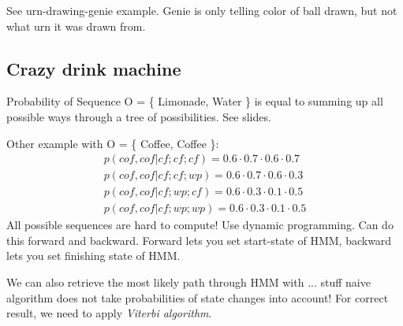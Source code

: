 \documentclass[11pt]{article}
\begin{document}
See urn-drawing-genie example. Genie is only telling color of ball drawn, but not what urn
it was drawn from. 

\subsection{Crazy drink machine}
Probability of Sequence O = \{ Limonade, Water \} is equal to summing up all possible ways
through a tree of possibilities. See slides.

Other example with O =  \{ Coffee, Coffee \}:
\begin{eqnarray*}
	p(cof, cof | cf; cf; cf) = 0.6 \cdot 0.7\cdot 0.6 \cdot 0.7 \\
	p(cof, cof | cf; cf; wp) = 0.6 \cdot 0.7\cdot 0.6\cdot0.3 \\
	p(cof, cof | cf; wp; cf) = 0.6 \cdot 0.3\cdot 0.1\cdot 0.5 \\
	p(cof, cof | cf; wp; wp) = 0.6 \cdot 0.3\cdot 0.1\cdot 0.5
\end{eqnarray*}
All possible sequences are hard to compute! Use dynamic programming. Can do this forward
and backward. Forward lets you set start-state of HMM, backward lets you set finishing
state of HMM.

We can also retrieve the most likely path through HMM with ... stuff naive algorithm does
 not take probabilities of state changes into account! For correct result, we need to
 apply \emph{Viterbi algorithm}.
\end{document}
